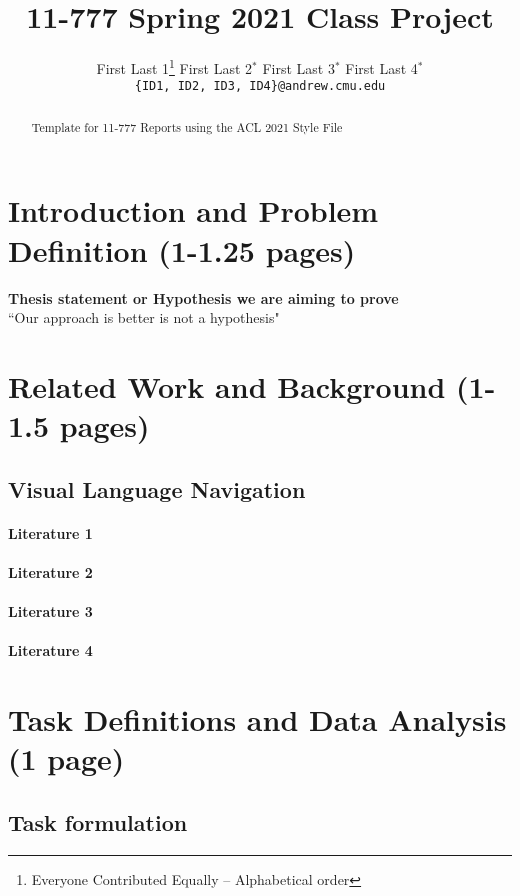 \documentclass[11pt,a4paper]{article}
\title{11-777 Spring 2021 Class Project}
\author{
  First Last 1\thanks{\hspace{4pt}Everyone Contributed Equally -- Alphabetical order} \hspace{2em} First Last 2$^*$ \hspace{2em} First Last 3$^*$ \hspace{2em} First Last 4$^*$ \\
  \texttt{\{ID1, ID2, ID3, ID4\}@andrew.cmu.edu}
  }
\date{}
\begin{document}
\maketitle
\begin{abstract}
Template for 11-777 Reports using the ACL 2021 Style File 
\end{abstract}

\section{Introduction and Problem Definition (1-1.25 pages)}
\textbf{Thesis statement or Hypothesis we are aiming to prove}\\
``Our approach is better is not a hypothesis"
\begin{figure}
\end{figure}

\clearpage
\section{Related Work and Background (1-1.5 pages)}

\subsection{Visual Language Navigation} 



\paragraph{Literature 1}
\paragraph{Literature 2}
\paragraph{Literature 3}
\paragraph{Literature 4}

\clearpage
\section{Task Definitions and Data Analysis (1 page)}
\subsection{Task formulation}
\end{document}
